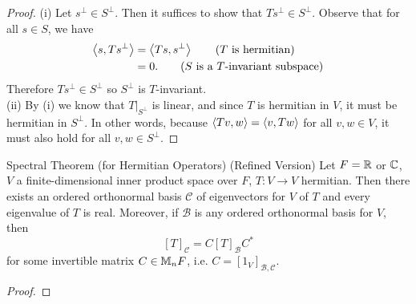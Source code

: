 \documentclass[class=article, crop=false]{standalone}
\begin{document}
  \begin{proof}
    (i) Let $s^\perp\in S^\perp$. Then it suffices to show that $Ts^\perp\in S^\perp$. Observe that for all $s\in S$, we have
    \begin{align*}
      \left\langle s, Ts^\perp \right\rangle &= \left\langle Ts, s^\perp \right\rangle \tag{$T$ is hermitian} \\
                        &= 0. \tag{$S$ is a $T$-invariant subspace}
    \end{align*}
    Therefore $Ts^\perp\in S^\perp$ so $S^\perp$ is $T$-invariant. \\[10pt]
    (ii) By (i) we know that $T|_{S^\perp}$ is linear, and since $T$ is hermitian in $V$, it must be hermitian in $S^\perp$. In other words, because $\left\langle Tv, w \right\rangle = \left\langle v, Tw \right\rangle$ for all $v, w\in V$, it must also hold for all $v, w\in S^\perp$.
  \end{proof}
  \newpage
  \begin{theorem}{Spectral Theorem (for Hermitian Operators) (Refined Version)}
    Let $F = \mathbb{R}$ or $\mathbb{C}$, $V$ a finite-dimensional inner product space over $F$, $T\colon V\to V$ hermitian. Then there exists an ordered orthonormal basis $\mathcal{C}$ of eigenvectors for $V$ of $T$ and every eigenvalue of $T$ is real. Moreover, if $\mathcal{B}$ is any ordered orthonormal basis for $V$, then
    \[
      [T]_{\mathcal{C}} = C[T]_{\mathcal{B}}C^*
    \]
    for some invertible matrix $C\in \mathbb{M}_nF$, i.e. $C = [1_V]_{\mathcal{B},\mathcal{C}}$.
  \end{theorem}
  \begin{proof}
    
  \end{proof}
  \newpage
\end{document}
